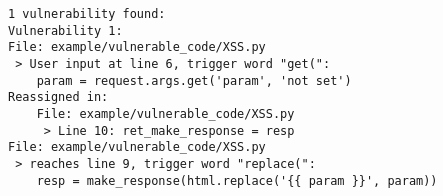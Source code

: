 \begin{lstlisting}[style=default, caption={An example of how the vulnerability log looks after it found one vulnerability.}, label={vulnerability_log_example}]
1 vulnerability found:
Vulnerability 1:
File: example/vulnerable_code/XSS.py
 > User input at line 6, trigger word "get(": 
	param = request.args.get('param', 'not set')
Reassigned in: 
	File: example/vulnerable_code/XSS.py
	 > Line 10: ret_make_response = resp
File: example/vulnerable_code/XSS.py
 > reaches line 9, trigger word "replace(": 
	resp = make_response(html.replace('{{ param }}', param))
\end{lstlisting}
